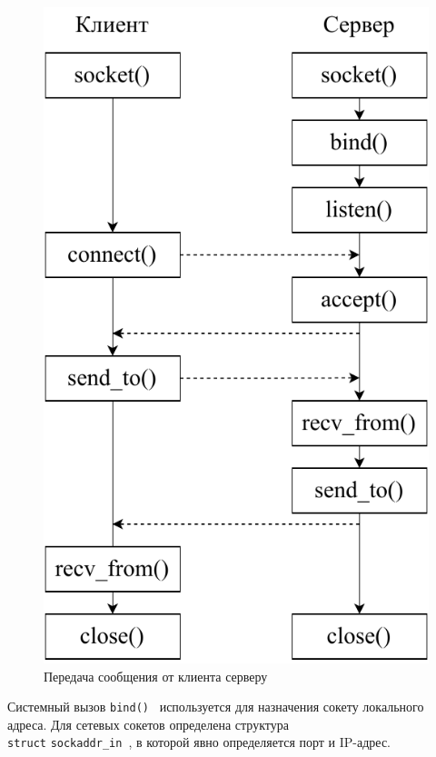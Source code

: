 \begin{figure}[ht]
	\centering
	\includegraphics[scale=0.8]{img/tcp.pdf}
	\caption{Передача сообщения от клиента серверу}
	\label{tcp}
\end{figure}

Системный вызов \texttt{bind()}~\cite{man-bind} используется для назначения сокету локального адреса. Для сетевых сокетов определена структура \\ \texttt{struct} \texttt{sockaddr\_in}~\cite{stevens}, в которой явно определяется порт и IP-адрес.

